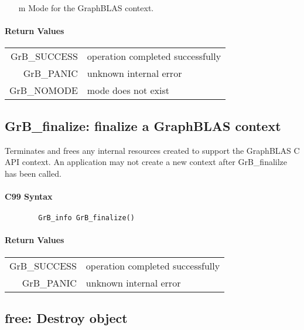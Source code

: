 \begin{itemize}
	\item[{\sf m}] Mode for the GraphBLAS context.
\end{itemize}

\paragraph{Return Values}

\begin{tabular}{rl}
{\sf GrB\_SUCCESS}	& operation completed successfully \\
{\sf GrB\_PANIC}	& unknown internal error \\
{\sf GrB\_NOMODE}	& mode does not exist \\
\end{tabular}


\subsection{{\sf GrB\_finalize}: finalize a GraphBLAS context}

Terminates and frees any internal resources created to 
support the GraphBLAS C API context.
An application may not create a new context after 
{\sf GrB\_finalilze} has been called.

\paragraph{C99 Syntax}

\begin{verbatim}
        GrB_info GrB_finalize()
\end{verbatim}

\paragraph{Return Values}

\begin{tabular}{rl}
{\sf GrB\_SUCCESS}	& operation completed successfully \\
{\sf GrB\_PANIC}	& unknown internal error \\
\end{tabular}

\subsection{{\sf free}: Destroy object}

